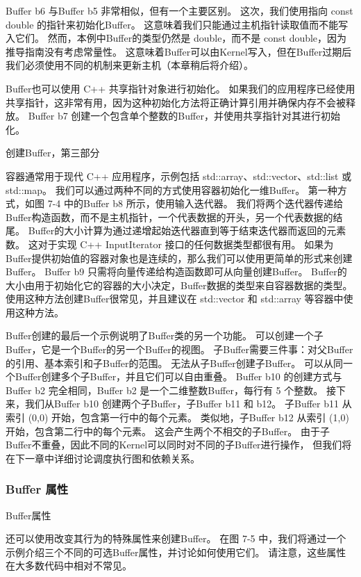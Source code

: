 Buffer b6 与Buffer b5 非常相似，但有一个主要区别。 这次，我们使用指向 const double 的指针来初始化Buffer。 
这意味着我们只能通过主机指针读取值而不能写入它们。 
然而，本例中Buffer的类型仍然是 double，而不是 const double，因为推导指南没有考虑常量性。 
这意味着Buffer可以由Kernel写入，但在Buffer过期后我们必须使用不同的机制来更新主机（本章稍后将介绍）。

Buffer也可以使用 C++ 共享指针对象进行初始化。 
如果我们的应用程序已经使用共享指针，这非常有用，因为这种初始化方法将正确计算引用并确保内存不会被释放。 
Buffer b7 创建一个包含单个整数的Buffer，并使用共享指针对其进行初始化。

{\color{red} 创建Buffer，第三部分}

容器通常用于现代 C++ 应用程序，示例包括 std::array、std::vector、std::list 或 std::map。 
我们可以通过两种不同的方式使用容器初始化一维Buffer。 第一种方式，如图 7-4 中的Buffer b8 所示，使用输入迭代器。 
我们将两个迭代器传递给Buffer构造函数，而不是主机指针，一个代表数据的开头，另一个代表数据的结尾。 
Buffer的大小计算为通过递增起始迭代器直到等于结束迭代器而返回的元素数。 
这对于实现 C++ InputIterator 接口的任何数据类型都很有用。 
如果为Buffer提供初始值的容器对象也是连续的，那么我们可以使用更简单的形式来创建Buffer。 
Buffer b9 只需将向量传递给构造函数即可从向量创建Buffer。 
Buffer的大小由用于初始化它的容器的大小决定，Buffer数据的类型来自容器数据的类型。 
使用这种方法创建Buffer很常见，并且建议在 std::vector 和 std::array 等容器中使用这种方法。

Buffer创建的最后一个示例说明了Buffer类的另一个功能。 可以创建一个子Buffer，它是一个Buffer的另一个Buffer的视图。
 子Buffer需要三件事：对父Buffer的引用、基本索引和子Buffer的范围。 无法从子Buffer创建子Buffer。 
 可以从同一个Buffer创建多个子Buffer，并且它们可以自由重叠。 
 Buffer b10 的创建方式与Buffer b2 完全相同，Buffer b2 是一个二维整数Buffer，每行有 5 个整数。 
 接下来，我们从Buffer b10 创建两个子Buffer，子Buffer b11 和 b12。 
 子Buffer b11 从索引 (0,0) 开始，包含第一行中的每个元素。 
 类似地，子Buffer b12 从索引 (1,0) 开始，包含第二行中的每个元素。 
 这会产生两个不相交的子Buffer。 由于子Buffer不重叠，因此不同的Kernel可以同时对不同的子Buffer进行操作，
 但我们将在下一章中详细讨论调度执行图和依赖关系。

\subsubsection{Buffer 属性}

{\color{red} Buffer属性}

还可以使用改变其行为的特殊属性来创建Buffer。 
在图 7-5 中，我们将通过一个示例介绍三个不同的可选Buffer属性，并讨论如何使用它们。 
请注意，这些属性在大多数代码中相对不常见。

